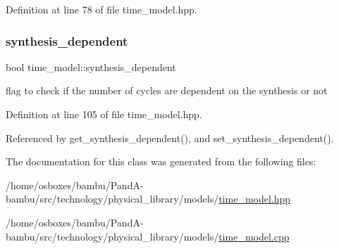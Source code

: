 Definition at line 78 of file time\+\_\+model.\+hpp.

\mbox{\label{classtime__model_ac3c675ab429d2fa91774c0f8184d0a8f}} 
\subsubsection{\texorpdfstring{synthesis\+\_\+dependent}{synthesis\_dependent}}
{\footnotesize\ttfamily bool time\+\_\+model\+::synthesis\+\_\+dependent\hspace{0.3cm}{\ttfamily [protected]}}



flag to check if the number of cycles are dependent on the synthesis or not 



Definition at line 105 of file time\+\_\+model.\+hpp.



Referenced by get\+\_\+synthesis\+\_\+dependent(), and set\+\_\+synthesis\+\_\+dependent().



The documentation for this class was generated from the following files\+:\begin{DoxyCompactItemize}
\item 
/home/osboxes/bambu/\+Pand\+A-\/bambu/src/technology/physical\+\_\+library/models/\hyperlink{time__model_8hpp}{time\+\_\+model.\+hpp}\item 
/home/osboxes/bambu/\+Pand\+A-\/bambu/src/technology/physical\+\_\+library/models/\hyperlink{time__model_8cpp}{time\+\_\+model.\+cpp}\end{DoxyCompactItemize}

